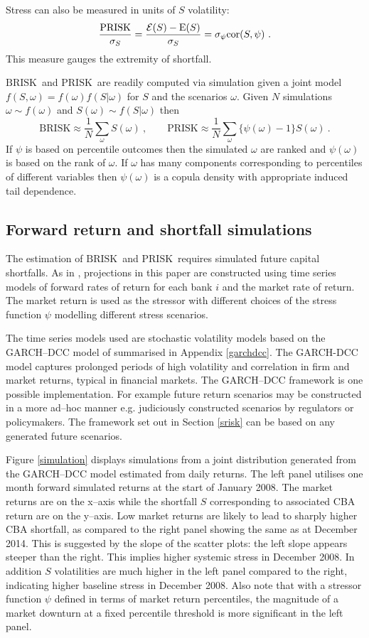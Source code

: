 \documentclass[authoryear]{elsarticle}
\newcommand{\E}{\mathrm{E}}
\newcommand{\Ex}{{\cal E}}
\newcommand{\Es}{\Ex}
\newcommand{\cor}{\mathrm{cor}}
\newcommand{\br}{\ensuremath{\mathrm{BRISK}}}
\newcommand{\pr}{\ensuremath{\mathrm{PRISK}}}
\newcommand{\fref}[1]{Figure \ref{#1}}
\newcommand{\sref}[1]{Section \ref{#1}}
\newcommand{\aref}[1]{Appendix \ref{#1}}
\newcommand{\cq}{\ , \qquad}
\begin{document}
  Stress can also be measured  in units of $S$ volatility:
$$
\frac{\pr}{\sigma_S}=\frac{\Es(S)-\E(S)}{\sigma_S}=\sigma_\psi\cor(S,\psi)\ .
$$
This measure gauges the extremity of shortfall.

\br\ and \pr\ are readily computed  via simulation given a joint model $f(S,\omega)=f(\omega)f(S|\omega)$ for $S$ and the scenarios $\omega$.   Given $N$ simulations $\omega\sim f(\omega)$ and $S(\omega)\sim f(S|\omega)$  then
$$
\br \approx \frac{1}{N}\sum_\omega S(\omega)\cq \pr\approx \frac{1}{N}\sum_\omega \{\psi(\omega)-1\}S(\omega)\ .
$$
If $\psi$ is based  on percentile outcomes   then the simulated $\omega$ are ranked and $\psi(\omega)$ is based on the rank of $\omega$.  If $\omega$ has many components corresponding to percentiles of different variables then $\psi(\omega)$ is a copula density with appropriate induced tail dependence.


\subsection{Forward return and shortfall simulations}\label{simulate}

The estimation of \br\  and \pr\   requires simulated future capital shortfalls. As in \cite{brownlees2015}, projections in this paper are constructed  using time series models of forward rates of return  for each bank $i$ and the market rate of return. The market return is used as the stressor with different choices of the stress function $\psi$ modelling different stress scenarios.

The time series models used are stochastic volatility models based on the GARCH--DCC model of \cite{engle2002dynamic} summarised in \aref{garchdcc}. The GARCH-DCC model captures prolonged periods of high volatility and correlation in firm and market returns, typical in financial markets. The GARCH--DCC framework is one possible implementation.   For example future return scenarios may be constructed in a more ad--hoc manner e.g. judiciously constructed scenarios by regulators or policymakers.   The  framework set out in \sref{srisk} can be based on  any  generated  future  scenarios.

\fref{simulation} displays simulations from a joint distribution generated from the GARCH--DCC model estimated from daily returns.  The left panel utilises  one month forward simulated returns at the start of January 2008.   The market returns are on the x--axis while the shortfall $S$ corresponding to associated CBA return are on the y--axis.  Low market returns are likely to lead to sharply higher CBA shortfall, as compared to the right panel showing the same as at December 2014.   This is suggested by the slope of the scatter plots:  the left slope appears steeper than the right. This implies higher systemic stress in December 2008. In addition $S$ volatilities are much higher in the left panel compared to the right, indicating higher baseline stress in December 2008. Also note that with a stressor function $\psi$ defined in terms of market return percentiles, the magnitude of a market downturn at a fixed percentile threshold is more significant in the left panel.
\end{document}
